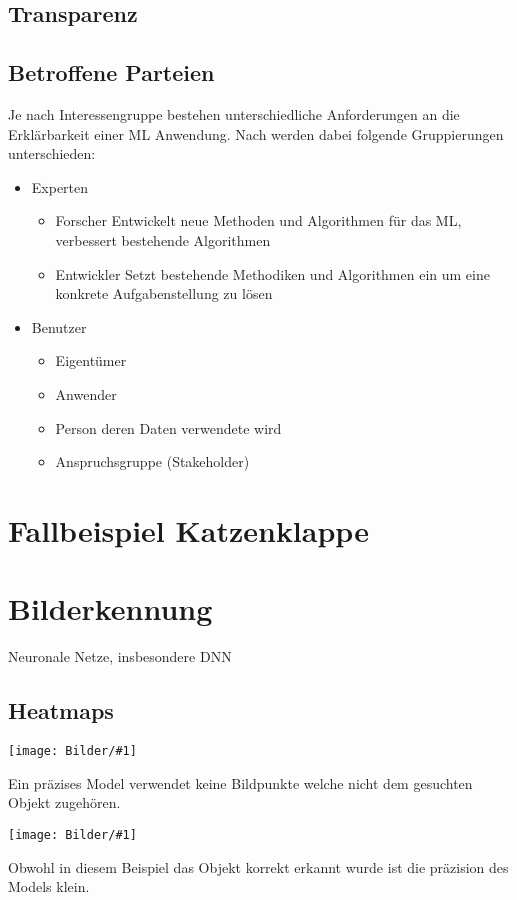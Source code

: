 \documentclass[
  12pt, %
  a4paper, %
  oneside, %
  openany, 
  numbers=noenddot, %
  BCOR=5mm, %
  parskip=half*, %
  thesis, %
]{bfhbook}
\newcommand{\imgText}[2]{
\begin{center}
    \begin{minipage}[t]{0.6\textwidth}
\texttt{[image: Bilder/\#1]}
	\end{minipage}\hfill
    \begin{minipage}[t]{0.4\textwidth}
  #2
    \end{minipage}
\end{center}
}
\begin{document}
\section{Transparenz}
\section{Betroffene Parteien}
Je nach Interessengruppe bestehen unterschiedliche Anforderungen an die Erklärbarkeit einer ML Anwendung. Nach \parencite{Ras2018} werden dabei folgende Gruppierungen unterschieden:
\begin{itemize}
  \item Experten
  	\begin{itemize}
  		\item Forscher Entwickelt neue Methoden und Algorithmen für das ML, verbessert bestehende Algorithmen
  		\item Entwickler Setzt bestehende Methodiken und Algorithmen ein um eine konkrete Aufgabenstellung zu lösen
	\end{itemize}
  \item Benutzer
  	\begin{itemize}
  		\item Eigentümer
  		\item Anwender
  		\item Person deren Daten verwendete wird
  		\item Anspruchsgruppe (Stakeholder)
	\end{itemize}
\end{itemize}

\chapter{Fallbeispiel Katzenklappe}

\chapter{Bilderkennung}
Neuronale Netze, insbesondere \Gls{DNN}
\section{Heatmaps}
\imgText{dog-good-heatmap.png}{ 
Ein präzises Model verwendet keine Bildpunkte welche nicht dem gesuchten Objekt zugehören.
}

\imgText{dog-bad-heatmap.png}{ 
Obwohl in diesem Beispiel das Objekt korrekt erkannt wurde ist die präzision des Models klein.
}
\end{document}
